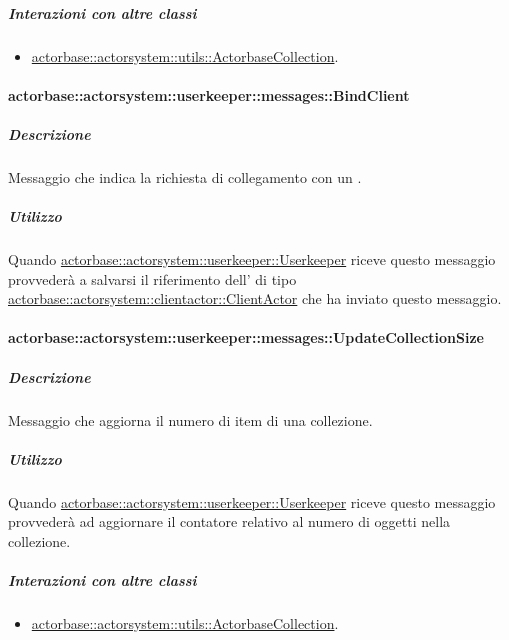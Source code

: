 \documentclass{scalatekids-article}
\begin{document}
\subparagraph{Interazioni con altre classi}
\begin{itemize}
\item \hyperref[sec:actorbase::actorsystem::utils::ActorbaseCollection]{actorbase::actorsystem::utils::ActorbaseCollection}.
\end{itemize}

\paragraph{actorbase::actorsystem::userkeeper::messages::BindClient}
\label{sec:actorbase::actorsystem::userkeeper::messages::BindClient}

\subparagraph{Descrizione}

Messaggio che indica la richiesta di collegamento con un .

\subparagraph{Utilizzo}

Quando \hyperref[sec:actorbase::actorsystem::userkeeper::Userkeeper]{actorbase::\allowbreak{}actorsystem::\allowbreak{}userkeeper::\allowbreak{}Userkeeper}
riceve questo messaggio provvederà a salvarsi il riferimento dell' di tipo
\hyperref[sec:actorbase::actorsystem::clientactor::ClientActor]{actorbase::\allowbreak{}actorsystem::\allowbreak{}clientactor::\allowbreak{}ClientActor}
che ha inviato questo messaggio.

\paragraph{actorbase::actorsystem::userkeeper::messages::UpdateCollectionSize}
\label{sec:actorbase::actorsystem::userkeeper::messages::UpdateCollectionSize}

\subparagraph{Descrizione}

Messaggio che aggiorna il numero di item di una collezione.

\subparagraph{Utilizzo}

Quando \hyperref[sec:actorbase::actorsystem::userkeeper::Userkeeper]{actorbase::\allowbreak{}actorsystem::\allowbreak{}userkeeper::\allowbreak{}Userkeeper}
riceve questo messaggio provvederà ad aggiornare il contatore relativo al numero di oggetti
nella collezione.

\subparagraph{Interazioni con altre classi}
\begin{itemize}
\item \hyperref[sec:actorbase::actorsystem::utils::ActorbaseCollection]{actorbase::actorsystem::utils::ActorbaseCollection}.
\end{itemize}
\end{document}
